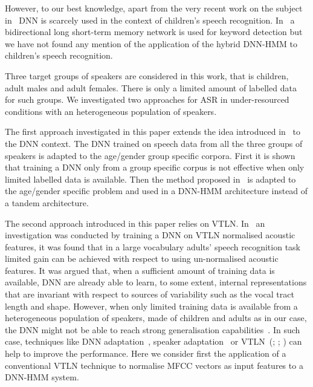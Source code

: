 \documentclass{nle}
\begin{document}
However, to our best knowledge, apart from the very recent work on the
subject in~\citet*{MatChe2014}  DNN is scarcely  used in the  context of
children's  speech recognition.   In~\citet*{Wollmer11}  a bidirectional
long short-term  memory network is  used for keyword detection  but we
have not found any mention of the application of the hybrid DNN-HMM to
children's speech recognition.

Three target groups  of speakers are considered in  this work, that is
children,  adult males  and adult  females.  There  is only  a limited
amount  of  labelled  data  for  such  groups.   We  investigated  two
approaches for ASR in under-resourced conditions with an heterogeneous
population of speakers.

The  first  approach  investigated   in  this  paper  extends  the  idea
introduced in~\citet{YocMor92} to the  DNN context.  The DNN trained on
speech data  from all the three  groups of speakers is  adapted to the
age/gender group specific corpora.  First  it is shown that training a
DNN  only from  a group  specific corpus  is not  effective  when only
limited  labelled  data  is   available.   Then  the  method  proposed
in~\citet{thomas13} is  adapted to the age/gender  specific problem and
used in a DNN-HMM architecture instead of a tandem architecture.

The second approach introduced in this paper relies on VTLN. 
In~\citet{seide11} an  investigation was conducted  by training a
DNN on VTLN normalised acoustic features, it was found that in a large
vocabulary  adults'  speech  recognition  task  limited  gain  can  be
achieved with respect to using un-normalised acoustic features.  It was
argued that, when  a sufficient amount of training  data is available,
DNN   are  already   able  to   learn,  to   some   extent,  internal
representations  that  are  invariant   with  respect  to  sources  of
variability such as  the vocal tract length and  shape.  However, when
only  limited  training  data   is  available  from  a  heterogeneous
population of speakers,  made of children and adults  as in our case,
the   DNN   might   not    be   able to  reach   strong   generalisation
capabilities~\citep*{SerGiu2014}.   In such  case,  techniques like  DNN
adaptation~\citep{vietbac10,swietojanski12,thomas13}, speaker
adaptation~\citep*{abdel2013rapid,liao2013speaker} or
VTLN~(\citealp*{EidGis96}; \citealp{LeeRos96}; \citealp*{WegMcaOrlPek96})  can help to  improve the
performance. Here we consider  first the application of a conventional
VTLN technique to normalise MFCC vectors as input features to a DNN-HMM system.
\end{document}
